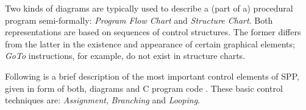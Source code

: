 Two kinds of diagrams are typically used to describe a (part of a) procedural
program semi-formally: \emph{Program Flow Chart} and \emph{Structure Chart}.
Both representations are based on sequences of control structures. The former
differs from the latter in the existence and appearance of certain graphical
elements; \emph{GoTo} instructions, for example, do not exist in structure
charts.

Following is a brief description of the most important control elements of SPP,
given in form of both, diagrams \cite{schiedermeier} and C program code
\cite{gcc}. These basic control techniques are: \emph{Assignment},
\emph{Branching} and \emph{Looping}.




